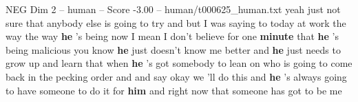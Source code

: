 \begin{textsample}{NEG Dim 2 – human – Score -3.00 – human/t000625\_human.txt}  \label{ex:f2_neg_003}
yeah just not sure that anybody else is going to try and but I was saying to today at work the way the way \textbf{he} 's being now I mean I don't believe for one \textbf{minute} that \textbf{he} 's being malicious you know \textbf{he} just doesn't know me better and \textbf{he} just needs to grow up and learn that when \textbf{he} 's got somebody to lean on who is going to come back in the pecking order and and say okay we 'll do this and \textbf{he} 's always going to have someone to do it for \textbf{him} and right now that someone has got to be me

\end{textsample}
